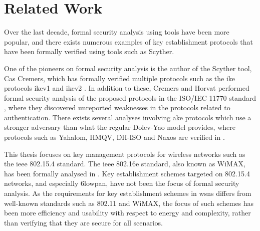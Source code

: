 
\section{Related Work}

Over the last decade, formal security analysis using tools have been more popular, and there exists numerous examples of key establishment protocols that have been formally verified using tools such as Scyther.

One of the pioneers on formal security analysis is the author of the Scyther tool, Cas Cremers, which has formally verified multiple protocols such as the \gls{ike} protocols \gls{ike}v1 and \gls{ike}v2 \cite{Cremers2011}. In addition to these, Cremers and Horvat performed formal security analysis of the proposed protocols in the ISO/IEC 11770 standard \cite{cremers2014improving}, where they discovered unreported weaknesses in the protocols related to authentication. There exists several analyses involving \gls{ake} protocols which use a stronger adversary than what the regular Dolev-Yao model provides, where protocols such as Yahalom, HMQV, DH-ISO and Naxos are verified in \cite{cremers2009comparing}. 


This thesis focuses on key management protocols for wireless networks such as the \gls{ieee} 802.15.4 standard. The \gls{ieee} 802.16e standard, also known as WiMAX, has been formally analysed in \cite{andova2008framework}. Key establishment schemes targeted on 802.15.4 networks, and especially \gls{6lowpan}, have not been the focus of formal security analysis. As the requirements for key establishment schemes in \gls{wsn}s differs from well-known standards such as 802.11 and WiMAX, the focus of such schemes has been more efficiency and usability with respect to energy and complexity, rather than verifying that they are secure for all scenarios.


